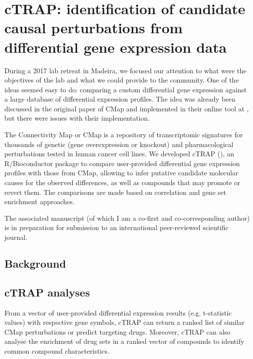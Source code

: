 \chapter{cTRAP: identification of candidate causal perturbations from differential gene expression data}
\label{chap:ctrap}

During a 2017 lab retreat in Madeira, we focused our attention to what were the objectives of the lab and what we could provide to the community. One of the ideas seemed easy to do: comparing a custom differential gene expression against a large database of differential expression profiles. The idea was already been discussed in the original paper of CMap and implemented in their online tool at , but there were issues with their implementation.

The Connectivity Map or CMap \cite{subramanian:2017ul} is a repository of transcriptomic signatures for thousands of genetic (gene overexpression or knockout) and pharmacological perturbations tested in human cancer cell lines. We developed cTRAP (), an R/Bioconductor package to compare user-provided differential gene expression profiles with those from CMap, allowing to infer putative candidate molecular causes for the observed differences, as well as compounds that may promote or revert them. The comparisons are made based on correlation and gene set enrichment \cite{subramanian:2005wu} approaches.

The associated manuscript (of which I am a co-first and co-corresponding author) is in preparation for submission to an international peer-reviewed scientific journal.

\section{Background}

\section{cTRAP analyses}

From a vector of user-provided differential expression results (e.g. t-statistic values) with respective gene symbols, cTRAP can return a ranked list of similar CMap perturbations or predict targeting drugs. Moreover, cTRAP can also analyse the enrichment of drug sets in a ranked vector of compounds to identify common compound characteristics.

